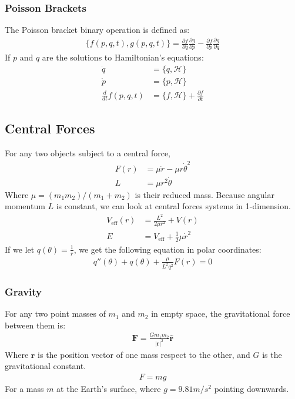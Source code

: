\documentclass[a4paper]{article}
\newcommand{\Hami}{\mathcal{H}}	       %
\newcommand{\ve}[1]{
  \ensuremath{\bm{#1}}}	               %
\newcommand{\uve}[1]{
  \ensuremath{\bm{\hat{#1}}}}          %
\newcommand{\pd}[2]{
  \ensuremath{
    \frac{\partial #1}{\partial #2} }} %
\begin{document}
\begin{multicols*}{2}
\subsubsection{Poisson Brackets}
The Poisson bracket binary operation is defined as:
\begin{align*}
  \{ f(p, q, t), g(p, q, t) \} = \pd{f}{q}\pd{g}{p} - \pd{f}{p}\pd{g}{q}
\end{align*}
If $p$ and $q$ are the solutions to Hamiltonian's equations:
\begin{align*}
  \dot{q} &= \{q, \Hami \} \\
  \dot{p} &= \{p, \Hami \} \\
  \frac{d}{dt} f(p, q, t) &= \{f, \Hami\} + \pd{f}{t}
\end{align*}
\subsection{Central Forces}
For any two objects subject to a central force,
\begin{align*}
  F(r) &= \mu \ddot{r} - \mu r \dot{\theta}^2\\
  L &= \mu r^2\dot{\theta}
\end{align*}
Where $\mu = (m_1 m_2)/(m_1 + m_2)$ is their reduced mass. Because angular
momentum $L$ is constant, we can look at central forces systems in 1-dimension.
\begin{align*}
  V_{\text{eff}}(r) &= \frac{L^2}{2 \mu r^2} + V(r) \\
  E &= V_{\text{eff}} + \frac{1}{2} \mu \dot{r}^2
\end{align*}
If we let $q(\theta) = \frac{1}{r}$, we get the following equation in polar
coordinates:
\begin{align*}
  q''(\theta) + q(\theta) + \frac{\mu}{L^2 q^2} F(r) = 0
\end{align*}
\subsubsection{Gravity}
For any two point masses of $m_1$ and $m_2$ in empty space, the gravitational
force between them is:
\begin{align*}
  \ve{F}=\frac{Gm_1m_2}{|\ve{r}|^2}\uve{r}
\end{align*}
Where $\ve{r}$ is the position vector of one mass respect to the other, and $G$
is the gravitational constant.
\begin{align*}
  F=mg
\end{align*}
\noindent For a mass $m$ at the Earth's surface, where $g=9.81m/s^2$ pointing
downwards.

\end{multicols*}
\end{document}
